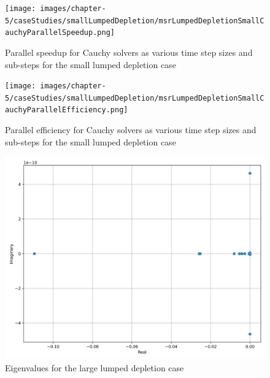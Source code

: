\clearpage

\begin{figure}[p]
    \centering
    \texttt{[image: images/chapter-5/caseStudies/smallLumpedDepletion/msrLumpedDepletionSmallCauchyParallelSpeedup.png]}
    \caption{Parallel speedup for Cauchy solvers as various time step sizes and sub-steps for the small lumped depletion case}
    \label{fig:small_lumped_depletion_cauchy_speedup}
\end{figure}

\clearpage

\begin{figure}[p]
    \centering
    \texttt{[image: images/chapter-5/caseStudies/smallLumpedDepletion/msrLumpedDepletionSmallCauchyParallelEfficiency.png]}
    \caption{Parallel efficiency for Cauchy solvers as various time step sizes and sub-steps for the small lumped depletion case}
    \label{fig:small_lumped_depletion_cauchy_parallel_eff}
\end{figure}

\clearpage

\begin{figure}[p]
    \centering
    \includegraphics[width=5in]{images/chapter-5/caseStudies/largeLumpedDepletion/msrLumpedDepletionLargeEigenvalues.png}
    \caption{Eigenvalues for the large lumped depletion case}
    \label{fig:large_lumped_depletion_eigenvalues}
\end{figure}

\clearpage

